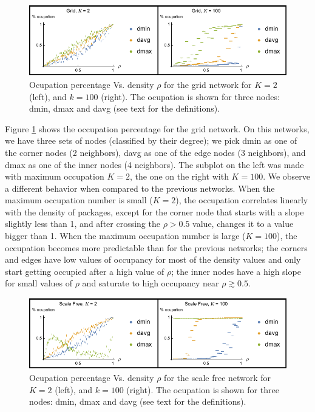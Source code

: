 \documentclass[12pt]{article}
\begin{document}
\begin{figure}[!hbt]
  \centering
  \includegraphics[width=\textwidth]{plots/ocupationVarianceGrid.pdf}
  \caption{Ocupation percentage Vs. density $\rho$ for the grid network for $K=2$ (left), and $k=100$ (right). 
    The ocupation is shown for three nodes: dmin, dmax and davg (see text for the definitions).}
  \label{fig:perOcGrid}
\end{figure}

Figure \ref{fig:perOcGrid} shows the occupation percentage for the grid network. 
On this networks, we have three sets of nodes (classified by their degree); we pick dmin as one of the corner nodes (2 neighbors), davg as one of the edge nodes (3 neighbors), and dmax as one of the inner nodes (4 neighbors).
The subplot on the left was made with maximum occupation $K=2$, the one on the right with $K=100$.
We observe a different behavior when compared to the previous networks. 
When the maximum occupation number is small ($K=2$), the occupation correlates linearly with the density of packages, except for the corner node that starts with a slope slightly less than 1, and after crossing the $\rho > 0.5$ value, changes it to a value bigger than 1. 
When the maximum occupation number is large ($K=100$), the occupation becomes more predictable than for the previous networks; the corners and edges have low values of occupancy for most of the density values and only start getting occupied after a high value of $\rho$; the inner nodes have a high slope for small values of $\rho$ and saturate to high occupancy near $\rho \gtrsim 0.5$.

\begin{figure}[!hbt]
  \centering
  \includegraphics[width=\textwidth]{plots/ocupationVarianceScaleFree.pdf}
  \caption{Ocupation percentage Vs. density $\rho$ for the scale free network for $K=2$ (left), and $k=100$ (right). 
    The ocupation is shown for three nodes: dmin, dmax and davg (see text for the definitions).}
  \label{fig:perOcScaleFree}
\end{figure}
\end{document}
